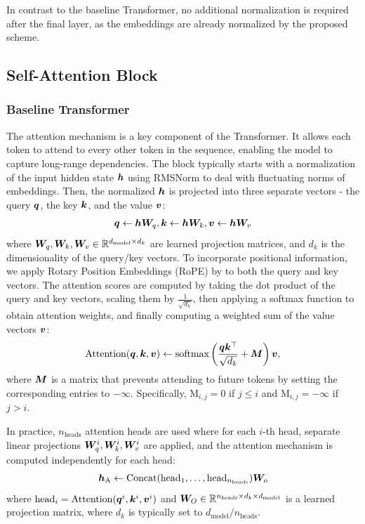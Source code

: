 \documentclass{article} %
\begin{document}
In contrast to the baseline Transformer, no additional normalization is required after the final layer, as the embeddings are already normalized by the proposed scheme.



\subsection{Self-Attention Block}
\label{section_selfattention}

\subsubsection{Baseline Transformer}

 The attention  mechanism is a key component of the Transformer. It allows each token to attend to every other token in the sequence, enabling the model to capture long-range dependencies. The block typically starts with a normalization of the input hidden state ${\bm{h}}$ using RMSNorm to deal with fluctuating norms of embeddings. Then, the normalized ${\bm{h}}$ is projected into three separate vectors - the query ${\bm{q}}$, the key ${\bm{k}}$, and the value ${\bm{v}}$:
\begin{align}
     {\bm{q}} \leftarrow {\bm{h}} {\bm{W}}_q, {\bm{k}} \leftarrow {\bm{h}} {\bm{W}}_k, {\bm{v}} \leftarrow {\bm{h}} {\bm{W}}_v\label{eq:QKV}
\end{align}
where ${\bm{W}}_q, {\bm{W}}_k, {\bm{W}}_v \in \mathbb{R}^{d_{\text{model}} \times d_k}$ are learned projection matrices, and $d_k$ is the dimensionality of the query/key vectors. To incorporate positional information, we apply Rotary Position Embeddings (RoPE) by \citet{su2024roformer} to both the query and key vectors. The attention scores are computed by taking the dot product of the query and key vectors, scaling them by $\frac{1}{\sqrt{d_k}}$, then applying a softmax function to obtain attention weights, and finally computing a weighted sum of the value vectors ${\bm{v}}$:
\begin{align}
     \text{Attention}({\bm{q}}, {\bm{k}}, {\bm{v}}) \leftarrow \text{softmax}\left( \frac{{\bm{q}}{\bm{k}}^\top}{\sqrt{d_k}} + {\bm{M}}\right){\bm{v}}, \label{eq:attQKV}
\end{align}
where ${\bm{M}}$ is a matrix that prevents attending to future tokens by setting the corresponding entries to $-\infty$. Specifically, $\text{M}_{i,j} = 0$ if $j \leq i$ and $\text{M}_{i,j} = -\infty$ if $j > i$.

 In practice, $n_{\text{heads}}$ attention heads are used where for each $i$-th head, separate linear projections ${\bm{W}}_q^i, {\bm{W}}_k^i, {\bm{W}}_v^i$ are applied, and the attention mechanism is computed independently for each head:
\begin{align}
     {\bm{h}}_{\text{A}}  \leftarrow \text{Concat}(\text{head}_1, \dots, \text{head}_{n_{\text{heads}}}) {\bm{W}}_o \label{eq:multihead}
\end{align}
where $\text{head}_i = \text{Attention}({\bm{q}}^i, {\bm{k}}^i, {\bm{v}}^i)$ and $ {\bm{W}}_O \in \mathbb{R}^{n_{\text{heads}} \times d_k \times d_{\text{model}}}$ is a learned projection matrix, where $d_k$ is typically set to $d_{\text{model}} / n_{\text{heads}}$.
\end{document}
